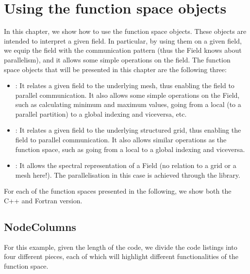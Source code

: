 \chapter{Using the function space objects}
In this chapter, we show how to use the function space 
objects. These objects are intended to interpret a 
given field. In particular, by using them on a given 
field, we equip the field with the communication pattern 
(thus the Field knows about parallelism), and it allows 
some simple operations on the field. The function space 
objects that will be presented in this chapter are the 
following three:
%
\begin{itemize}
\item {}: It relates a given field to the underlying 
mesh, thus enabling the field to parallel communication. 
It also allows some simple operations on the Field, such 
as calculating minimum and maximum values, going from a 
local (to a parallel partition) to a global indexing and 
viceversa, etc.
\item {}: It relates 
a given field to the underlying structured grid, thus enabling 
the field to parallel communication. It also allows similar 
operations as the  function space, such as going 
from a local to a global indexing and viceversa.
\item {}: It allows the spectral representation 
of a Field (no relation to a grid or a mesh here!). The 
parallelisation in this case is achieved through the  
library.
\end{itemize}
%
For each of the function spaces presented in the following, 
we show both the C++ and Fortran version. 

\section{NodeColumns}
For this example, given the length of the code, we divide the code
listings into four different pieces, each of which will highlight 
different functionalities of the function space.

